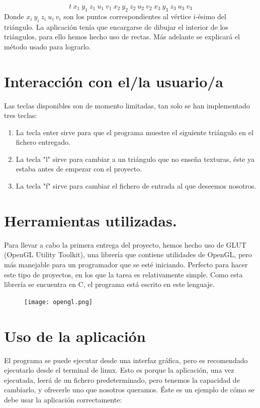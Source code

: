 \documentclass[12pt,a4paper]{article}
\begin{document}
$$
t\ x_1\  y_1\ z_1\ u_1\ v_1\ x_2\ y_2\ z_2\ u_2\ v_2\ x_3\ y_3\ z_3\ u_3\ v_3
$$
Donde $x_i\ y_i\ z_i\ u_i\ v_i$ son los puntos correspondientes al vértice i-ésimo del triángulo. La aplicación tenía que encargarse de dibujar el interior de los triángulos, para ello hemos hecho uso de rectas. Más adelante se explicará el método usado para lograrlo. 
\section{Interacción con el/la usuario/a}
Las teclas disponibles son de momento limitadas, tan solo se han implementado tres teclas:
\begin{enumerate}
	\item La tecla enter sirve para que el programa muestre el siguiente triángulo en el fichero entregado.
	\item La tecla "l" sirve para cambiar a un triángulo que no enseña texturas, éste ya estaba antes de empezar con el proyecto.
	\item La tecla "f" sirve para cambiar el fichero de entrada al que deseemos nosotros.
\end{enumerate}
\section{Herramientas utilizadas.}
Para llevar a cabo la primera entrega del proyecto, hemos hecho uso de GLUT (OpenGL Utility Toolkit), una librería que contiene utilidades de OpenGL, pero más manejable para un programador que se esté iniciando. Perfecto para hacer este tipo de proyectos, en los que la tarea es relativamente simple. Como esta librería se encuentra en C, el programa está escrito en este lenguaje.
\begin{figure}[H]
	\centering
\texttt{[image: opengl.png]}
\end{figure}
\section{Uso de la aplicación}
El programa se puede ejecutar desde una interfaz gráfica, pero es recomendado ejecutarlo desde el terminal de linux. Esto es porque la aplicación, una vez ejecutada, leerá de un fichero predeterminado, pero tenemos la capacidad de cambiarlo, y ofrecerle uno que nosotros queramos. Éste es un ejemplo de cómo se debe usar la aplicación correctamente:
\end{document}
